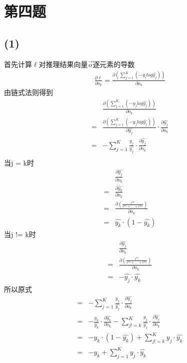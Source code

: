 \documentclass[12pt,a4paper]{article}
\begin{document}
\section{第四题}
\subsection*{(1)}
首先计算$\ell$对推理结果向量$\vec{o}$逐元素的导数
\begin{align*}
    \frac{\partial \ell}{\partial o_k} = \frac{\partial (\sum_{j = 1}^{K}(-y_ilog\hat{y_j}))}{\partial o_k}
\end{align*}
由链式法则得到
\begin{align*}
      & \frac{\partial (\sum_{j = 1}^{K}(-y_jlog\hat{y_j}))}{\partial o_k}                                                    \\
    = & \frac{\partial (\sum_{j = 1}^{K}(-y_jlog\hat{y_j}))}{\partial \hat{y_j}}\cdot \frac{\partial \hat{y_j}}{\partial o_k} \\
    = & -\sum_{j = 1}^{K}\frac{y_j}{\hat{y_j}}\cdot \frac{\partial \hat{y_j}}{\partial o_k}                                   \\
\end{align*}
当j = k时\\
\begin{align*}
      & \frac{\partial \hat{y_j}}{\partial o_k}                             \\
    = & \frac{\partial \hat{y_k}}{\partial o_k}                             \\
    = & \frac{\partial (\frac{e^{o_k}}{e^{o_1}+...+e^{o_K}})}{\partial o_k} \\
    = & \hat{y_k}\cdot (1-\hat{y_k})
\end{align*}
当j != k时\\
\begin{align*}
      & \frac{\partial \hat{y_j}}{\partial o_k}                             \\
    = & \frac{\partial (\frac{e^{o_j}}{e^{o_1}+...+e^{o_K}})}{\partial o_k} \\
    = & -\hat{y_j}\cdot\hat{y_k}
\end{align*}
所以原式
\begin{align*}
    = & -\sum_{j = 1}^{K}\frac{y_j}{\hat{y_j}}\cdot \frac{\partial \hat{y_j}}{\partial o_k}                                                                    \\
    = & -\frac{y_k}{\hat{y_k}}\cdot\frac{\partial \hat{y_k}}{\partial o_k}-\sum_{j != k}^{K}\frac{y_j}{\hat{y_j}}\cdot \frac{\partial \hat{y_j}}{\partial o_k} \\
    = & -y_k\cdot(1-\hat{y_k})+\sum_{j != k}^{K}{y_j}\cdot \hat{y_k}                                                                                           \\
    = & -y_k+\sum_{j = 1}^{K}{y_j}\cdot \hat{y_k}                                                                                                              \\
\end{align*}
\end{document}
